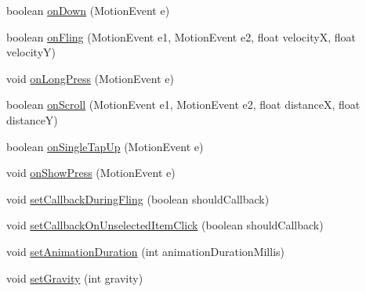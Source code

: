 \begin{DoxyCompactItemize}
\item 
boolean \hyperlink{classcom_1_1zia_1_1freshdocs_1_1widget_1_1fileexplorer_1_1carousel_1_1_carousel_ab14cdd6bf7556ba404e146a7bce4df66}{on\-Down} (Motion\-Event e)
\item 
boolean \hyperlink{classcom_1_1zia_1_1freshdocs_1_1widget_1_1fileexplorer_1_1carousel_1_1_carousel_a83ef8b56bdd5b2af4552e1f84dcc0ea4}{on\-Fling} (Motion\-Event e1, Motion\-Event e2, float velocity\-X, float velocity\-Y)
\item 
void \hyperlink{classcom_1_1zia_1_1freshdocs_1_1widget_1_1fileexplorer_1_1carousel_1_1_carousel_a6eaf9c5f20054bb8697a6054f97a49cd}{on\-Long\-Press} (Motion\-Event e)
\item 
boolean \hyperlink{classcom_1_1zia_1_1freshdocs_1_1widget_1_1fileexplorer_1_1carousel_1_1_carousel_ada9685b4adf3585082bf69fe0161992d}{on\-Scroll} (Motion\-Event e1, Motion\-Event e2, float distance\-X, float distance\-Y)
\item 
boolean \hyperlink{classcom_1_1zia_1_1freshdocs_1_1widget_1_1fileexplorer_1_1carousel_1_1_carousel_a1c28a58947f2af1402f4e84c68a70461}{on\-Single\-Tap\-Up} (Motion\-Event e)
\item 
void \hyperlink{classcom_1_1zia_1_1freshdocs_1_1widget_1_1fileexplorer_1_1carousel_1_1_carousel_a2cefc58b7c7245d26a11859fbfd4b039}{on\-Show\-Press} (Motion\-Event e)
\item 
void \hyperlink{classcom_1_1zia_1_1freshdocs_1_1widget_1_1fileexplorer_1_1carousel_1_1_carousel_a26205f432a21bb9c79ab63620774958a}{set\-Callback\-During\-Fling} (boolean should\-Callback)
\item 
void \hyperlink{classcom_1_1zia_1_1freshdocs_1_1widget_1_1fileexplorer_1_1carousel_1_1_carousel_ac552df2a11fbc1d31ac245e4596c6c89}{set\-Callback\-On\-Unselected\-Item\-Click} (boolean should\-Callback)
\item 
void \hyperlink{classcom_1_1zia_1_1freshdocs_1_1widget_1_1fileexplorer_1_1carousel_1_1_carousel_a52dbc9eca40eeaa646a4ae79c8b46700}{set\-Animation\-Duration} (int animation\-Duration\-Millis)
\item 
void \hyperlink{classcom_1_1zia_1_1freshdocs_1_1widget_1_1fileexplorer_1_1carousel_1_1_carousel_acc43ee2facadd1d9ce9447d3f4f89318}{set\-Gravity} (int gravity)
\end{DoxyCompactItemize}
